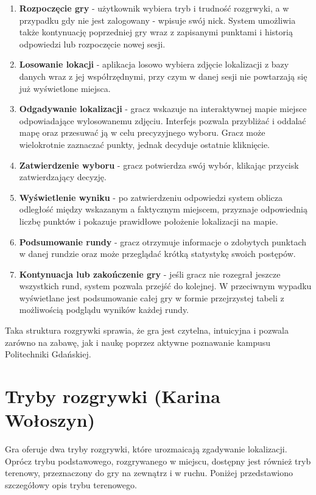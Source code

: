 \begin{enumerate}
    \item \textbf{Rozpoczęcie gry} - użytkownik wybiera tryb i trudność rozgrwyki, a w przypadku gdy nie jest zalogowany - wpisuje swój nick. System umożliwia także kontynuację poprzedniej gry wraz z zapisanymi punktami i historią odpowiedzi lub rozpoczęcie nowej sesji.
    \item \textbf{Losowanie lokacji} - aplikacja losowo wybiera zdjęcie lokalizacji z bazy danych wraz z jej współrzędnymi, przy czym w danej sesji nie powtarzają się już wyświetlone miejsca.
    \item \textbf{Odgadywanie lokalizacji} - gracz wskazuje na interaktywnej mapie miejsce odpowiadające wylosowanemu zdjęciu. Interfejs pozwala przybliżać i oddalać mapę oraz przesuwać ją w celu precyzyjnego wyboru. Gracz może wielokrotnie zaznaczać punkty, jednak decyduje ostatnie kliknięcie.
    \item \textbf{Zatwierdzenie wyboru} - gracz potwierdza swój wybór, klikając przycisk zatwierdzający decyzję.
    \item \textbf{Wyświetlenie wyniku} - po zatwierdzeniu odpowiedzi system oblicza odległość między wskazanym a faktycznym miejscem, przyznaje odpowiednią liczbę punktów i pokazuje prawidłowe położenie lokalizacji na mapie.
    \item \textbf{Podsumowanie rundy} - gracz otrzymuje informacje o zdobytych punktach w danej rundzie oraz może przeglądać krótką statystykę swoich postępów.
    \item \textbf{Kontynuacja lub zakończenie gry} - jeśli gracz nie rozegrał jeszcze wszystkich rund, system pozwala przejść do kolejnej. W przeciwnym wypadku wyświetlane jest podsumowanie całej gry w formie przejrzystej tabeli z możliwością podglądu wyników każdej rundy.
\end{enumerate}

Taka struktura rozgrywki sprawia, że gra jest czytelna, intuicyjna i pozwala zarówno na zabawę, jak i naukę poprzez aktywne poznawanie kampusu Politechniki Gdańskiej.

\section{Tryby rozgrywki (Karina Wołoszyn)}

Gra oferuje dwa tryby rozgrywki, które urozmaicają zgadywanie lokalizacji. Oprócz trybu podstawowego, rozgrywanego w miejscu, dostępny jest również tryb terenowy, przeznaczony do gry na zewnątrz i w ruchu. Poniżej przedstawiono szczegółowy opis trybu terenowego.

